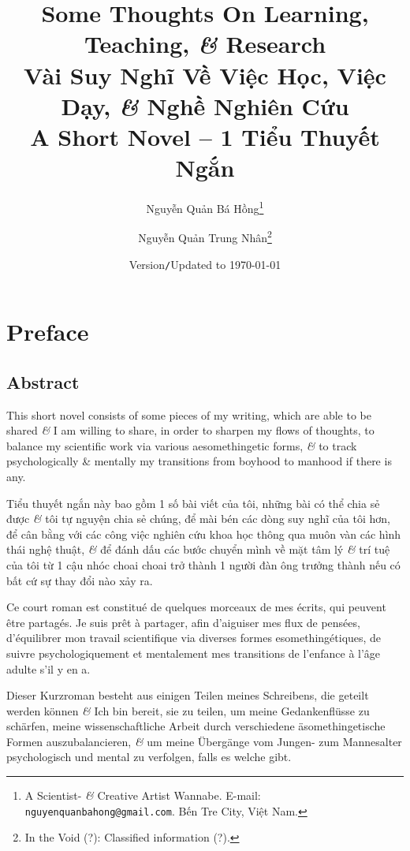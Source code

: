 \documentclass[12pt,oneside]{book}
\title{Some Thoughts On Learning, Teaching, {\it\&} Research\\Vài Suy Nghĩ Về Việc Học, Việc Dạy, {\it\&} Nghề Nghiên Cứu\\{\Large\sf A Short Novel -- 1 Tiểu Thuyết Ngắn}}
\author{\sc Nguyễn Quản Bá Hồng\footnote{A Scientist- {\it\&} Creative Artist Wannabe. E-mail: {\tt nguyenquanbahong@gmail.com}. Bến Tre City, Việt Nam.}\and\sf Nguyễn Quản Trung Nhân\footnote{In the Void (?): Classified information (?).}}
\date{Version{\tt/}Updated to \today}
\begin{document}
\maketitle
\setcounter{secnumdepth}{4}
\setcounter{tocdepth}{4}
\dominitoc%
\tableofcontents

\chapter*{Preface}

\section*{Abstract}
{\sf[en]} This short novel consists of some pieces of my writing, which are able to be shared {\it\&} I am willing to share, in order to sharpen my flows of thoughts, to balance my scientific work via various aesomethingetic forms, {\it\&} to track psychologically \& mentally my transitions from boyhood to manhood if there is any.
\vspace{2mm}

\noindent{\sf[vi]} Tiểu thuyết ngắn này bao gồm 1 số bài viết của tôi, những bài có thể chia sẻ được {\it\&} tôi tự nguyện chia sẻ chúng, để mài bén các dòng suy nghĩ của tôi hơn, để cân bằng với các công việc nghiên cứu khoa học thông qua muôn vàn các hình thái nghệ thuật, {\it\&} để đánh dấu các bước chuyển mình về mặt tâm lý {\it\&} trí tuệ của tôi từ 1 cậu nhóc choai choai trở thành 1 người đàn ông trưởng thành nếu có bất cứ sự thay đổi nào xảy ra.
\vspace{2mm}

\noindent{\sf[fr]} Ce court roman est constitué de quelques morceaux de mes écrits, qui peuvent être partagés. Je suis prêt à partager, afin d'aiguiser mes flux de pensées, d'équilibrer mon travail scientifique via diverses formes esomethingétiques, de suivre psychologiquement et mentalement mes transitions de l'enfance à l'âge adulte s'il y en a.
\vspace{2mm}

\noindent{\sf[de]} Dieser Kurzroman besteht aus einigen Teilen meines Schreibens, die geteilt werden können {\it\&} Ich bin bereit, sie zu teilen, um meine Gedankenflüsse zu schärfen, meine wissenschaftliche Arbeit durch verschiedene äsomethingetische Formen auszubalancieren, {\it\&} um meine Übergänge vom Jungen- zum Mannesalter psychologisch und mental zu verfolgen, falls es welche gibt.
\end{document}
